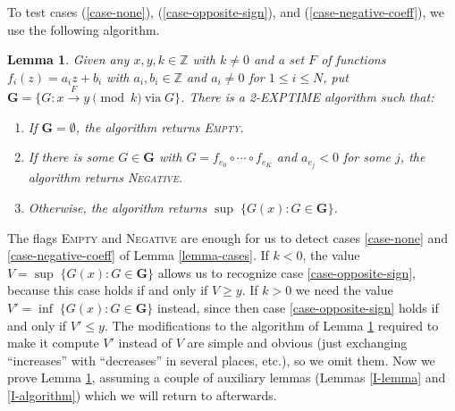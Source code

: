 \documentclass[11pt]{amsart}
\newcommand{\Z}{\mathbb{Z}}
\newtheorem{lemma}{Lemma}
\theoremstyle{definition}
\theoremstyle{remark}
\begin{document}
To test cases (\ref{case-none}), (\ref{case-opposite-sign}), and (\ref{case-negative-coeff}), we use the following algorithm.

\begin{lemma} \label{largest-mod-reachable}
Given any $x, y, k \in \Z$ with $k \ne 0$ and a set $F$ of functions $f_i(z) = a_i z + b_i$ with $a_i, b_i \in \Z$ and $a_i \ne 0$ for $1 \le i \le N$, put $\mathbf{G} = \{ G : x \xrightarrow{F} y \pmod k \: \text{via} \; G \}$. There is a \textsf{2-EXPTIME} algorithm such that:
\begin{enumerate}
\item If $\mathbf{G} = \emptyset$, the algorithm returns \textsc{Empty}.
\item If there is some $G \in \mathbf{G}$ with $G = f_{e_0} \circ \cdots \circ f_{e_K}$ and $a_{e_j} < 0$ for some $j$, the algorithm returns \textsc{Negative}.
\item Otherwise, the algorithm returns $\sup \; \{ G(x) : G \in \mathbf{G} \}$.
\end{enumerate}
\end{lemma}

The flags \textsc{Empty} and \textsc{Negative} are enough for us to detect cases \ref{case-none} and \ref{case-negative-coeff} of Lemma \ref{lemma-cases}. If $k < 0$, the value $V = \sup \; \{ G(x) : G \in \mathbf{G} \}$ allows us to recognize case \ref{case-opposite-sign}, because this case holds if and only if $V \ge y$. If $k > 0$ we need the value $V' = \inf \; \{ G(x) : G \in \mathbf{G} \}$ instead, since then case \ref{case-opposite-sign} holds if and only if $V' \le y$. The modifications to the algorithm of Lemma \ref{largest-mod-reachable} required to make it compute $V'$ instead of $V$ are simple and obvious (just exchanging ``increases'' with ``decreases'' in several places, etc.), so we omit them. Now we prove Lemma \ref{largest-mod-reachable}, assuming a couple of auxiliary lemmas (Lemmas \ref{I-lemma} and \ref{I-algorithm}) which we will return to afterwards.
\end{document}
